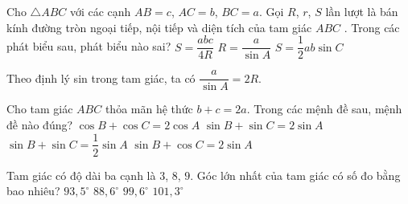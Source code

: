\begin{ex}
	Cho $\triangle ABC$ với các cạnh $AB=c$, $AC=b$, $BC=a$. Gọi $R$, $r$, $S$ lần lượt là bán kính đường tròn ngoại tiếp, nội tiếp và diện tích của tam giác $ABC$ . Trong các phát biểu sau, phát biểu nào sai?
	\choice
	{$S=\dfrac{abc}{4R}$ }
	{\True $R=\dfrac{a}{\sin A}$ }
	{$S=\dfrac{1}{2}ab\sin C$ }
	
	\loigiai
	{
		Theo định lý sin trong tam giác, ta có $\dfrac{a}{\sin A}=2R$.
	}
\end{ex}
\begin{ex}
	Cho tam giác $ABC$ thỏa mãn hệ thức $b+c=2a$. Trong các mệnh đề sau, mệnh đề nào đúng?
	\choice
	{$\cos B+\cos C=2\cos A$}
	{\True $\sin B+\sin C=2\sin A$}
	{$\sin B+\sin C=\dfrac{1}{2}\sin A$}
	{$\sin B+\cos C=2\sin A$}
\end{ex}
\begin{ex}
	Tam giác có độ dài ba cạnh là $3$, $8$, $9$. Góc lớn nhất của tam giác có số đo bằng bao nhiêu?
	\choice
	{$93{,}5^\circ$}
	{$88{,}6^\circ$}
	{\True $99{,}6^\circ$}
	{$101{,}3^\circ$}
\end{ex}

